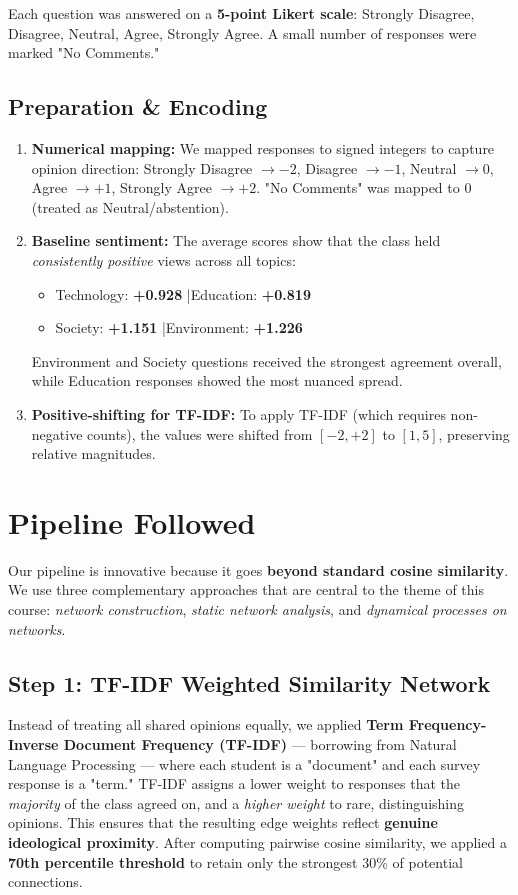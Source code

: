 \documentclass[11pt]{article}
\begin{document}
Each question was answered on a \textbf{5-point Likert scale}: Strongly Disagree, Disagree, Neutral, Agree, Strongly Agree. A small number of responses were marked "No Comments."

\subsection*{Preparation \& Encoding}
\begin{enumerate}
    \item \textbf{Numerical mapping:} We mapped responses to signed integers to capture opinion direction: Strongly Disagree $\rightarrow -2$, Disagree $\rightarrow -1$, Neutral $\rightarrow 0$, Agree $\rightarrow +1$, Strongly Agree $\rightarrow +2$. "No Comments" was mapped to $0$ (treated as Neutral/abstention).
    \item \textbf{Baseline sentiment:} The average scores show that the class held \textit{consistently positive} views across all topics:
    \begin{itemize}
        \item Technology: \textbf{+0.928} \quad|\quad Education: \textbf{+0.819}
        \item Society: \textbf{+1.151} \quad|\quad Environment: \textbf{+1.226}
    \end{itemize}
    Environment and Society questions received the strongest agreement overall, while Education responses showed the most nuanced spread.
    \item \textbf{Positive-shifting for TF-IDF:} To apply TF-IDF (which requires non-negative counts), the values were shifted from $[-2, +2]$ to $[1, 5]$, preserving relative magnitudes.
\end{enumerate}

\section{Pipeline Followed}
Our pipeline is innovative because it goes \textbf{beyond standard cosine similarity}. We use three complementary approaches that are central to the theme of this course: \textit{network construction}, \textit{static network analysis}, and \textit{dynamical processes on networks}.

\subsection{Step 1: TF-IDF Weighted Similarity Network}
Instead of treating all shared opinions equally, we applied \textbf{Term Frequency-Inverse Document Frequency (TF-IDF)} — borrowing from Natural Language Processing — where each student is a "document" and each survey response is a "term." TF-IDF assigns a lower weight to responses that the \textit{majority} of the class agreed on, and a \textit{higher weight} to rare, distinguishing opinions. This ensures that the resulting edge weights reflect \textbf{genuine ideological proximity}. After computing pairwise cosine similarity, we applied a \textbf{70th percentile threshold} to retain only the strongest 30\% of potential connections.
\end{document}
